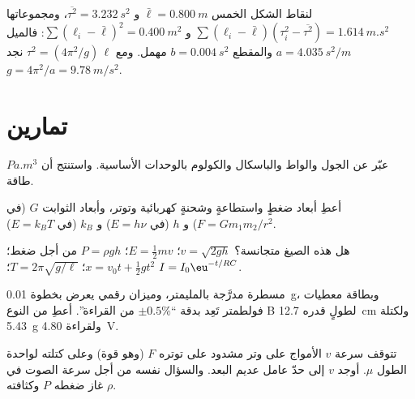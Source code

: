 \begin{example}\label{ex:b1:units-dimensions:slope}
لنقاط الشكل الخمس $\bar\ell = \qty{0.800}{m}$ و
$\overline{\tau^2} = \qty{3.232}{s^2}$، ومجموعاتها
$\sum (\ell_i - \bar\ell)(\tau_i^2 - \overline{\tau^2}) = \qty{1.614}{m.s^2}$ و
$\sum (\ell_i - \bar\ell)^2 = \qty{0.400}{m^2}$: فالميل
$a = \qty{4.035}{s^2/m}$ والمقطع $b = \qty{0.004}{s^2}$ مهمل. ومع
$\tau^2 = (4\pi^2/g)\,\ell$ نجد $g = 4\pi^2/a = \qty{9.78}{m/s^2}$.
\end{example}

\section{تمارين}

\begin{exercise}[$\star$]\label{exo:b1:units-dimensions:1}
عبّر عن الجول والواط والباسكال والكولوم بالوحدات الأساسية.
واستنتج أن $\unit{Pa.m^3}$  طاقة.
\end{exercise}

\begin{exercise}[$\star$]\label{exo:b1:units-dimensions:2}
أعطِ أبعاد ضغطٍ واستطاعةٍ وشحنةٍ كهربائية وتوتر، وأبعاد الثوابت
$G$ (في $F = Gm_1m_2/r^2$) و $h$ (في
$E = h\nu$) و $k_B$ (في $E = k_B T$).
\end{exercise}

\begin{exercise}[$\star$]\label{exo:b1:units-dimensions:3}
هل هذه الصيغ متجانسة؟ $v = \sqrt{2gh}$؛
$E = \tfrac12 m v$؛ $P = \rho g h$ من أجل ضغط؛ $x = v_0 t +
\tfrac12 g t^2$؛ $T = 2\pi\sqrt{g/\ell}$؛ $I = I_0 \eu^{-t/RC}$.
\end{exercise}

\begin{exercise}[$\star$]\label{exo:b1:units-dimensions:4}
مسطرة مدرَّجة بالمليمتر، وميزان رقمي يعرض بخطوة \qty{0.01}{g}،
وبطاقة معطيات فولطمتر تَعِد بدقة ``$\pm 0.5\%$ من القراءة''. أعطِ
 من النوع B لطولٍ قدره \qty{12.7}{cm} ولكتلة
\qty{5.43}{g} ولقراءة \qty{4.80}{V}.
\end{exercise}

\begin{exercise}[$\star\star$]\label{exo:b1:units-dimensions:5}
تتوقف سرعة $v$ الأمواج على وتر مشدود على توتره $F$ (وهو قوة) وعلى
كتلته لواحدة الطول $\mu$. أوجد $v$ إلى حدّ عامل عديم البعد. والسؤال
نفسه من أجل سرعة الصوت في غاز ضغطه $P$ وكثافته $\rho$.
\end{exercise}

